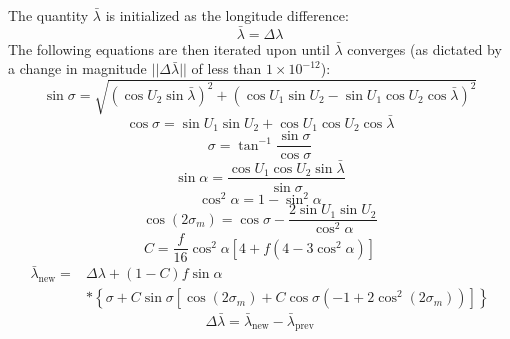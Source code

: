 The quantity $\bar{\lambda}$ is initialized as the longitude difference:
\begin{equation}
\bar{\lambda} = \Delta\lambda
\end{equation}
The following equations are then iterated upon until $\bar{\lambda}$ converges (as dictated by a change in magnitude $||\Delta\bar{\lambda}||$ of less than $1 \times 10^{-12}$):
\begin{equation}
\sin \sigma = \sqrt{(\cos U_2\sin \bar{\lambda})^2 + (\cos U_1 \sin U_2 - \sin U_1 \cos U_2 \cos \bar{\lambda} )^2}
\end{equation}
\begin{equation}
\cos \sigma = \sin U_1 \sin U_2 + \cos U_1 \cos U_2 \cos \bar{\lambda}
\end{equation}
\begin{equation}
\sigma = \tan^{-1} \frac{\sin \sigma}{\cos \sigma}
\end{equation}
\begin{equation}
\sin \alpha = \frac{\cos U_1 \cos U_2 \sin \bar{\lambda}}{\sin \sigma}
\end{equation}
\begin{equation}
\cos^2 \alpha = 1 - \sin^2 \alpha
\end{equation}
\begin{equation}
\cos(2 \sigma_m) = \cos \sigma - \frac{2 \sin U_1 \sin U_2}{\cos^2 \alpha}
\end{equation}
\begin{equation}
C = \frac{f}{16} \cos^2 \alpha \left[ 4 + f \left(4 - 3 \cos^2 \alpha \right) \right]
\end{equation}
\begin{equation}
\begin{split}
\bar{\lambda}_{\text{new}} =& \Delta\lambda + (1 - C) f \sin \alpha \\ 
& * \left\lbrace \sigma + C \sin \sigma \left[ \cos(2\sigma_m) + C \cos\sigma \left(-1 + 2 \cos^2(2\sigma_m) \right) \right]  \right\rbrace 
\end{split}
\end{equation}
\begin{equation}
\Delta\bar{\lambda} = \bar{\lambda}_{\text{new}} - \bar{\lambda}_{\text{prev}}
\end{equation}

